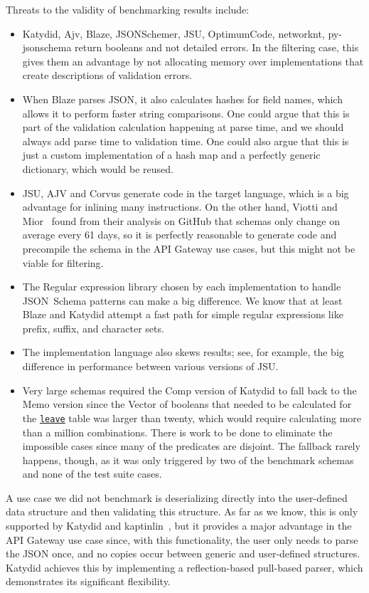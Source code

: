 \documentclass[runningheads]{llncs}
\newcommand{\link}[2]{\mbox{\hyperref[#2]{\lstinline{#1}}}\xspace}
\newcommand{\leave}{\link{leave}{def leave}}
\newcommand{\JSONSchema}{%
  JSON~Schema\xspace%
}
\newcommand{\GitHub}{%
  GitHub\xspace%
}
\newcommand{\JSON}{\ac{JSON}\xspace}
\begin{document}
Threats to the validity of benchmarking results include:
\begin{itemize}
\item Katydid, Ajv, Blaze, JSONSchemer, JSU, OptimumCode, networknt, py-jsonschema return booleans and not detailed errors. In the filtering case, this gives them an advantage by not allocating memory over implementations that create descriptions of validation errors.
\item When Blaze parses \JSON, it also calculates hashes for field names, which allows it to perform faster string comparisons. One could argue that this is part of the validation calculation happening at parse time, and we should always add parse time to validation time. One could also argue that this is just a custom implementation of a hash map and a perfectly generic dictionary, which would be reused.
\item JSU, AJV and Corvus generate code in the target language, which is a big advantage for inlining many instructions. On the other hand, Viotti and Mior~\cite{blaze} found from their analysis on \GitHub that schemas only change on average every 61 days, so it is perfectly reasonable to generate code and precompile the schema in the API Gateway use cases, but this might not be viable for filtering.
\item The Regular expression library chosen by each implementation to handle \JSONSchema patterns can make a big difference. We know that at least Blaze and Katydid attempt a fast path for simple regular expressions like prefix, suffix, and character sets.
\item The implementation language also skews results; see, for example, the big difference in performance between various versions of JSU.
\item Very large schemas required the Comp version of Katydid to fall back to the Memo version since the Vector of booleans that needed to be calculated for the \leave table was larger than twenty, which would require calculating more than a million combinations. There is work to be done to eliminate the impossible cases since many of the predicates are disjoint. The fallback rarely happens, though, as it was only triggered by two of the benchmark schemas and none of the test suite cases. 
\end{itemize}

A use case we did not benchmark is deserializing directly into the user-defined data structure and then validating this structure.
As far as we know, this is only supported by Katydid and kaptinlin~\cite{jsonschema_impl_go-kaptinlin}, but it provides a major advantage in the API Gateway use case since, with this functionality, the user only needs to parse the \JSON once, and no copies occur between generic and user-defined structures.
Katydid achieves this by implementing a reflection-based pull-based parser, which demonstrates its significant flexibility.
\end{document}
